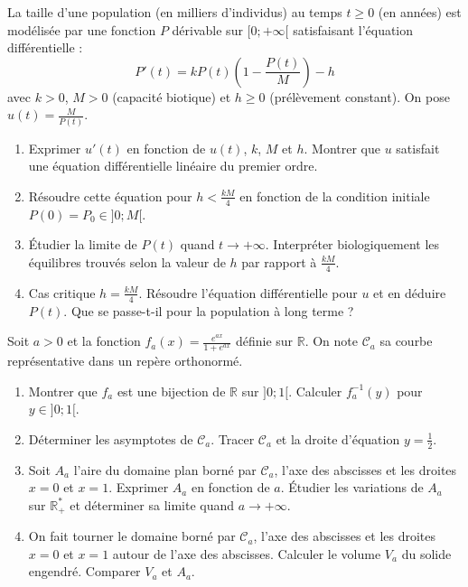 \documentclass[11pt]{article}
\begin{document}
\begin{exercice}
La taille d'une population (en milliers d'individus) au temps $t \geqslant 0$ (en années) est modélisée par une fonction $P$ dérivable sur $[0; +\infty[$ satisfaisant l'équation différentielle :
$$ P'(t) = k P(t) \left(1 - \frac{P(t)}{M}\right) - h $$
avec $k > 0$, $M > 0$ (capacité biotique) et $h \geqslant 0$ (prélèvement constant). On pose $u(t) = \frac{M}{P(t)}$.
\begin{enumerate}
    \item Exprimer $u'(t)$ en fonction de $u(t)$, $k$, $M$ et $h$. Montrer que $u$ satisfait une équation différentielle linéaire du premier ordre.
    \item Résoudre cette équation pour $h < \frac{kM}{4}$ en fonction de la condition initiale $P(0) = P_0 \in ]0; M[$.
    \item Étudier la limite de $P(t)$ quand $t \to +\infty$. Interpréter biologiquement les équilibres trouvés selon la valeur de $h$ par rapport à $\frac{kM}{4}$.
    \item Cas critique $h = \frac{kM}{4}$. Résoudre l'équation différentielle pour $u$ et en déduire $P(t)$. Que se passe-t-il pour la population à long terme ?
\end{enumerate}
\end{exercice}

\begin{exercice}
Soit $a > 0$ et la fonction $f_a(x) = \frac{e^{ax}}{1 + e^{ax}}$ définie sur $\mathbb{R}$. On note $\mathcal{C}_a$ sa courbe représentative dans un repère orthonormé.
\begin{enumerate}
    \item Montrer que $f_a$ est une bijection de $\mathbb{R}$ sur $]0; 1[$. Calculer $f_a^{-1}(y)$ pour $y \in ]0; 1[$.
    \item Déterminer les asymptotes de $\mathcal{C}_a$. Tracer $\mathcal{C}_a$ et la droite d'équation $y = \frac{1}{2}$.
    \item Soit $A_a$ l'aire du domaine plan borné par $\mathcal{C}_a$, l'axe des abscisses et les droites $x=0$ et $x=1$. Exprimer $A_a$ en fonction de $a$. Étudier les variations de $A_a$ sur $\mathbb{R}_+^*$ et déterminer sa limite quand $a \to +\infty$.
    \item On fait tourner le domaine borné par $\mathcal{C}_a$, l'axe des abscisses et les droites $x=0$ et $x=1$ autour de l'axe des abscisses. Calculer le volume $V_a$ du solide engendré. Comparer $V_a$ et $A_a$.
\end{enumerate}
\end{exercice}
\end{document}

